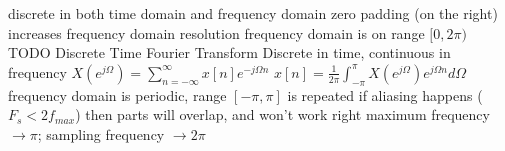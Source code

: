\documentclass[12pt]{article}
\begin{document}
\begin{multicols*}{2}
\begin{flushleft}
\begin{outline}[longenum]

  \1 discrete in both time domain and frequency domain
  \1 zero padding (on the right) increases frequency domain resolution
  \1 frequency domain is on range $[0, 2\pi)$
  \1 TODO
  \1 Discrete Time Fourier Transform
  \1 Discrete in time, continuous in frequency
  \1 $X(e^{j\Omega}) = \sum_{n=-\infty}^{\infty} x[n] e^{-j\Omega n}$
  \1 $x[n] = \frac{1}{2\pi} \int_{-\pi}^{\pi} X(e^{j\Omega}) e^{j\Omega n} d\Omega$
  \1 frequency domain is periodic, range $[-\pi,\pi]$ is repeated
    \2 if aliasing happens ($F_s < 2 f_{max}$) then parts will overlap, and won't work right
  \1 maximum frequency $\rightarrow \pi$; sampling frequency $\rightarrow 2\pi$



\end{outline}
\end{flushleft}
\end{multicols*}
\end{document}
